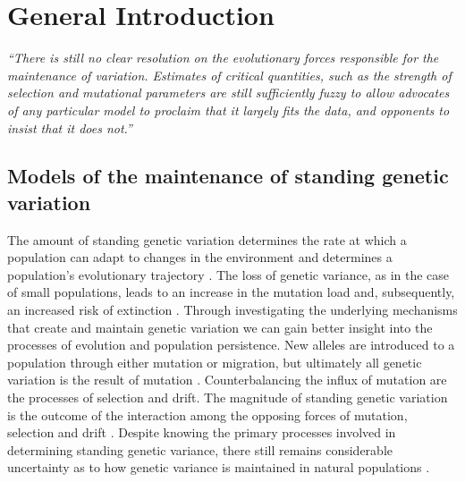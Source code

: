 \chapter{General Introduction}

\begin{center}
    \textit{“There is still no clear resolution on the evolutionary forces responsible for the maintenance of variation. Estimates of critical quantities, such as the strength of selection and mutational parameters are still sufficiently fuzzy to allow advocates of any particular model to proclaim that it largely fits the data, and opponents to insist that it does not.”} \citet{Wals18}
\end{center}

\section{Models of the maintenance of standing genetic variation} 
The amount of standing genetic variation determines the rate at which a population can adapt to changes in the environment and determines a population’s evolutionary trajectory \citep{Land79, Hans08}. The loss of genetic variance, as in the case of small populations, leads to an increase in the mutation load and, subsequently, an increased risk of extinction \citep{Mull64, Lync90, Land94}. Through investigating the underlying mechanisms that create and maintain genetic variation we can gain better insight into the processes of evolution and population persistence. New alleles are introduced to a population through either mutation or migration, but ultimately all genetic variation is the result of mutation \citep{Falc96, John05}. Counterbalancing the influx of mutation are the processes of selection and drift. The magnitude of standing genetic variation is the outcome of the interaction among the opposing forces of mutation, selection and drift \citep{Fish30}. Despite knowing the primary processes involved in determining standing genetic variance, there still remains considerable uncertainty as to how genetic variance is maintained in natural populations \citep{Ture85, John05}. \par

